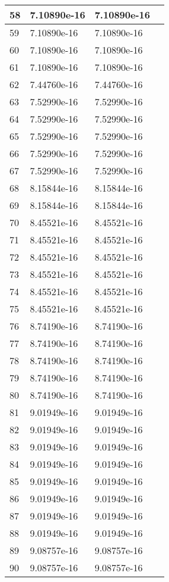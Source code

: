 \documentclass{article}
\begin{document}
\begin{table}[H]
{\begin{tabular}{|l|l|l|l|}
58 & 7.10890e-16 & 7.10890e-16 \\ \hline
59 & 7.10890e-16 & 7.10890e-16 \\ \hline
60 & 7.10890e-16 & 7.10890e-16 \\ \hline
61 & 7.10890e-16 & 7.10890e-16 \\ \hline
62 & 7.44760e-16 & 7.44760e-16 \\ \hline
63 & 7.52990e-16 & 7.52990e-16 \\ \hline
64 & 7.52990e-16 & 7.52990e-16 \\ \hline
65 & 7.52990e-16 & 7.52990e-16 \\ \hline
66 & 7.52990e-16 & 7.52990e-16 \\ \hline
67 & 7.52990e-16 & 7.52990e-16 \\ \hline
68 & 8.15844e-16 & 8.15844e-16 \\ \hline
69 & 8.15844e-16 & 8.15844e-16 \\ \hline
70 & 8.45521e-16 & 8.45521e-16 \\ \hline
71 & 8.45521e-16 & 8.45521e-16 \\ \hline
72 & 8.45521e-16 & 8.45521e-16 \\ \hline
73 & 8.45521e-16 & 8.45521e-16 \\ \hline
74 & 8.45521e-16 & 8.45521e-16 \\ \hline
75 & 8.45521e-16 & 8.45521e-16 \\ \hline
76 & 8.74190e-16 & 8.74190e-16 \\ \hline
77 & 8.74190e-16 & 8.74190e-16 \\ \hline
78 & 8.74190e-16 & 8.74190e-16 \\ \hline
79 & 8.74190e-16 & 8.74190e-16 \\ \hline
80 & 8.74190e-16 & 8.74190e-16 \\ \hline
81 & 9.01949e-16 & 9.01949e-16 \\ \hline
82 & 9.01949e-16 & 9.01949e-16 \\ \hline
83 & 9.01949e-16 & 9.01949e-16 \\ \hline
84 & 9.01949e-16 & 9.01949e-16 \\ \hline
85 & 9.01949e-16 & 9.01949e-16 \\ \hline
86 & 9.01949e-16 & 9.01949e-16 \\ \hline
87 & 9.01949e-16 & 9.01949e-16 \\ \hline
88 & 9.01949e-16 & 9.01949e-16 \\ \hline
89 & 9.08757e-16 & 9.08757e-16 \\ \hline
90 & 9.08757e-16 & 9.08757e-16 \\ \hline

\end{tabular}}
\end{table}
\end{document}
